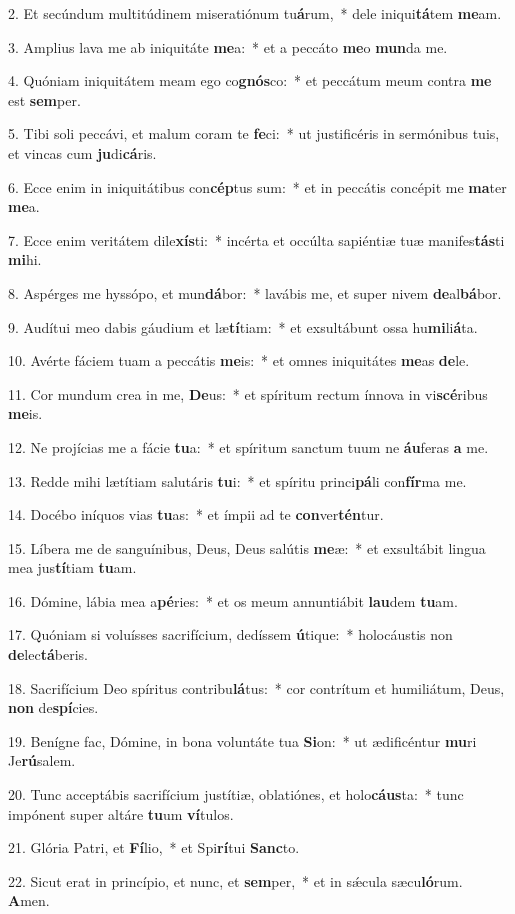 2. Et secúndum multitúdinem miseratiónum tu\textbf{á}rum,~*  dele iniqui\textbf{tá}tem \textbf{me}am.\

3. Amplius lava me ab iniquitáte \textbf{me}a:~*  et a peccáto \textbf{me}o \textbf{mun}da me.\

4. Quóniam iniquitátem meam ego co\textbf{gnós}co:~*  et peccátum meum contra \textbf{me} est \textbf{sem}per.\

5. Tibi soli peccávi, et malum coram te \textbf{fe}ci:~*  ut justificéris in sermónibus tuis, et vincas cum \textbf{ju}di\textbf{cá}ris.\

6. Ecce enim in iniquitátibus con\textbf{cép}tus sum:~*  et in peccátis concépit me \textbf{ma}ter \textbf{me}a.\

7. Ecce enim veritátem dile\textbf{xís}ti:~*  incérta et occúlta sapiéntiæ tuæ manifes\textbf{tás}ti \textbf{mi}hi.\

8. Aspérges me hyssópo, et mun\textbf{dá}bor:~*  lavábis me, et super nivem \textbf{de}al\textbf{bá}bor.\

9. Audítui meo dabis gáudium et læ\textbf{tí}tiam:~*  et exsultábunt ossa hu\textbf{mi}li\textbf{á}ta.\

10. Avérte fáciem tuam a peccátis \textbf{me}is:~*  et omnes iniquitátes \textbf{me}as \textbf{de}le.\

11. Cor mundum crea in me, \textbf{De}us:~*  et spíritum rectum ínnova in vi\textbf{scé}ribus \textbf{me}is.\

12. Ne projícias me a fácie \textbf{tu}a:~*  et spíritum sanctum tuum ne \textbf{áu}feras \textbf{a} me.\

13. Redde mihi lætítiam salutáris \textbf{tu}i:~*  et spíritu princi\textbf{pá}li con\textbf{fír}ma me.\

14. Docébo iníquos vias \textbf{tu}as:~*  et ímpii ad te \textbf{con}ver\textbf{tén}tur.\

15. Líbera me de sanguínibus, Deus, Deus salútis \textbf{me}æ:~*  et exsultábit lingua mea jus\textbf{tí}tiam \textbf{tu}am.\

16. Dómine, lábia mea a\textbf{pé}ries:~*  et os meum annuntiábit \textbf{lau}dem \textbf{tu}am.\

17. Quóniam si voluísses sacrifícium, dedíssem \textbf{ú}tique:~*  holocáustis non \textbf{de}lec\textbf{tá}beris.\

18. Sacrifícium Deo spíritus contribu\textbf{lá}tus:~*  cor contrítum et humiliátum, Deus, \textbf{non} de\textbf{spí}cies.\

19. Benígne fac, Dómine, in bona voluntáte tua \textbf{Si}on:~*  ut ædificéntur \textbf{mu}ri Je\textbf{rú}salem.\

20. Tunc acceptábis sacrifícium justítiæ, oblatiónes, et holo\textbf{cáus}ta:~*  tunc impónent super altáre \textbf{tu}um \textbf{ví}tulos.\

21. Glória Patri, et \textbf{Fí}lio,~*  et Spi\textbf{rí}tui \textbf{Sanc}to.\

22. Sicut erat in princípio, et nunc, et \textbf{sem}per,~*  et in sǽcula sæcu\textbf{ló}rum. \textbf{A}men.\

